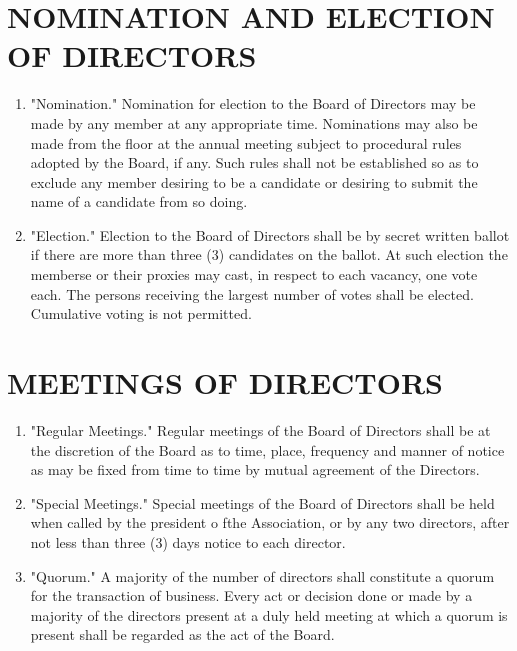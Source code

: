 \documentclass[12pt, letterpaper]{article}
\begin{document}
\section{NOMINATION AND ELECTION OF DIRECTORS}
\begin{enumerate}
 \item "Nomination."
  Nomination for election to the Board of Directors may be made by any member at any appropriate time.
  Nominations may also be made from the floor at the annual meeting subject to procedural rules adopted by the Board, if any.
  Such rules shall not be established so as to exclude any member desiring to be a candidate or desiring to submit the name of a candidate from so doing.
 \item "Election."
  Election to the Board of Directors shall be by secret written ballot if there are more than three (3) candidates on the ballot.  At such election the memberse or their proxies may cast, in respect to each vacancy, one vote each.
  The persons receiving the largest number of votes shall be elected.
  Cumulative voting is not permitted.
\end{enumerate}

\section{MEETINGS OF DIRECTORS}
\begin{enumerate}
 \item "Regular Meetings."
  Regular meetings of the Board of Directors shall be at the discretion of the Board as to time, place, frequency and manner of notice as may be fixed from time to time by mutual agreement of the Directors.
 \item "Special Meetings."
  Special meetings of the Board of Directors shall be held when called by the president o fthe Association, or by any two directors, after not less than three (3) days notice to each director.
 \item "Quorum." A majority of the number of directors shall constitute a quorum for the transaction of business.
  Every act or decision done or made by a majority of the directors present at a duly held meeting at which a quorum is present shall be regarded as the act of the Board.
\end{enumerate}

\end{document}
